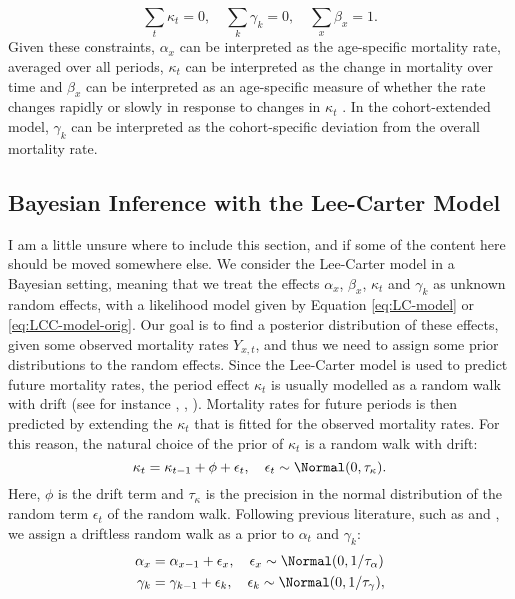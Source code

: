 \begin{equation}
    \sum_t\kappa_t = 0,\quad \sum_k\gamma_k = 0, \quad \sum_x\beta_x = 1.
    \label{eq:LC-constraints}    
\end{equation}
Given these constraints, $\alpha_x$ can be interpreted as the age-specific mortality rate, averaged over all periods, $\kappa_t$ can be interpreted as the change in mortality over time and $\beta_x$ can be interpreted as an age-specific measure of whether the rate changes rapidly or slowly in response to changes in $\kappa_t$ \cite{LeeCarter1992}. In the cohort-extended model, $\gamma_k$ can be interpreted as the cohort-specific deviation from the overall mortality rate.

\subsection{Bayesian Inference with the Lee-Carter Model}
\textcolor{myDarkGreen}{I am a little unsure where to include this section, and if some of the content here should be moved somewhere else. }
We consider the Lee-Carter model in a Bayesian setting, meaning that we treat the effects $\alpha_x$, $\beta_x$, $\kappa_t$ and $\gamma_k$ as unknown random effects, with a likelihood model given by Equation \ref{eq:LC-model} or \ref{eq:LCC-model-orig}. Our goal is to find a posterior distribution of these effects, given some observed mortality rates $Y_{x,t}$, and thus we need to assign some prior distributions to the random effects. Since the Lee-Carter model is used to predict future mortality rates, the period effect $\kappa_t$ is usually modelled as a random walk with drift (see for instance \cite{LeeCarter1992}, \cite{Wisniowski2015}, \cite{CZADO2005260}). Mortality rates for future periods is then predicted by extending the $\kappa_t$ that is fitted for the observed mortality rates. For this reason, the natural choice of the prior of $\kappa_t$ is a random walk with drift:
\begin{equation}
    \kappa_t = \kappa_{t-1} + \phi  + \epsilon_t,\quad \epsilon_t \sim \Normal(0,\tau_{\kappa}).
    \label{eq:randomWalkDrift}
\end{equation}
Here, $\phi$ is the drift term and $\tau_{\kappa}$ is the precision in the normal distribution of the random term $\epsilon_t$ of the random walk. 
Following previous literature, such as \textcite{CZADO2005260} and \textcite{Wisniowski2015}, we assign a driftless random walk as a prior to $\alpha_t$ and $\gamma_k$:
\begin{equation}
    \begin{aligned}
        \alpha_x &= \alpha_{x-1} + \epsilon_{x}, \quad \epsilon_x \sim \Normal(0,1/\tau_{\alpha}) \\
        \gamma_k &= \gamma_{k-1} + \epsilon_{k}, \quad \epsilon_k \sim \Normal(0,1/\tau_{\gamma}), \\
    \end{aligned}
\end{equation}

